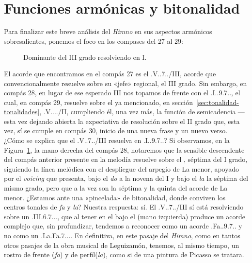 \section{Funciones armónicas y bitonalidad}
\label{sec:funciones-bitonalidad}

Para finalizar este breve análisis del \emph{Himno} en sus aspectos armónicos sobresalientes, ponemos el foco en los compases del 27 al 29:

\begin{figure}[H]
\centering
{}
\caption{Dominante del III grado resolviendo en I.}
\label{fig:V-III}
\end{figure}

El acorde que encontramos en el compás 27 es el \acorde.V..7../III, acorde que convencionalmente resuelve sobre su «jefe» regional, el III grado. Sin embargo, en compás 28, en lugar de ese esperado III nos topamos de frente con el \acorde.I..9.7.., el cual, en compás 29, resuelve sobre el ya mencionado, en sección~\ref{sec:tonalidad-tonalidades}, \acorde.V..../II, cumpliendo él, una vez más, la función de semicadencia ---esta vez dejando abierta la expectativa de resolución sobre el II grado que, esta vez, sí se cumple en compás 30, inicio de una nueva frase y un nuevo verso. ¿Cómo se explica que el \acorde.V..7../III resuelva en \acorde.I..9.7..? Si observamos, en la Figura~\ref{fig:V-III}, la mano derecha del compás 28, notaremos que la sensible descendente  del compás anterior presente en la melodía resuelve sobre el , séptima del I grado, siguiendo la línea melódica con el despliegue del arpegio de La menor, apoyado por el \emph{voicing} que presenta, bajo el \emph{do} a la novena del I y bajo el \emph{la} la séptima del mismo grado, pero que a la vez son la séptima y la quinta del acorde de La menor. ¿Estamos ante una «pincelada» de bitonalidad, donde conviven los centros tonales de \emph{fa} y \emph{la}? Nuestra respuesta: sí. El \acorde.V..7../III sí está resolviendo sobre un \acorde.III.6.7..., que al tener en el bajo el  (mano izquierda) produce un acorde complejo que, sin profundizar, tendemos a reconocer como un acorde \acorde.Fa..9.7.. y no como un \acorde.La.Fa.7.... En definitiva, en este pasaje del \emph{Himno}, como en tantos otros pasajes de la obra musical de Leguizamón, tenemos, al mismo tiempo, un rostro de frente (\emph{fa}) y de perfil(\emph{la}), como si de una pintura de Picasso se tratara.
